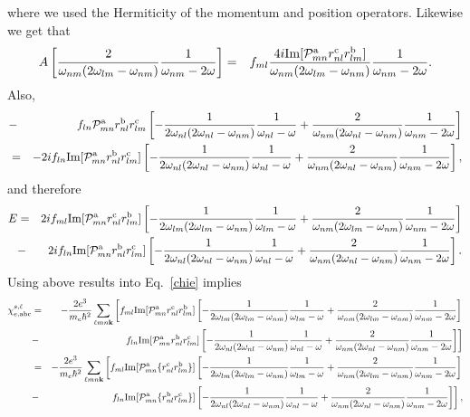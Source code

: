 \documentclass[floatfix,prb,aps,superscriptaddress,11pt,preprint]{revtex4}
\begin{document}
where we used the Hermiticity of the momentum and position operators.
Likewise we get that
\begin{eqnarray}\label{si}
A
\left[
\frac{2}{\omega_{nm}(2\omega_{lm}-\omega_{nm})}\frac{1}{\omega_{nm}-2\omega}
\right]&=&
f_{ml}
\frac{4i\mathrm{Im}[{\cal P}^{\mathrm{a}}_{mn}r^{\mathrm{c}}_{nl}r^{\mathrm{b}}_{lm}]}{\omega_{nm}(2\omega_{lm}-\omega_{nm})}\frac{1}{\omega_{nm}-2\omega}
.
\end{eqnarray}
Also,
\begin{eqnarray}\label{is}
&-&
f_{ln}{\cal P}^{\mathrm{a}}_{mn}r^{\mathrm{b}}_{nl}r^{\mathrm{c}}_{lm}
\left[
-\frac{1}{2\omega_{nl}(2\omega_{nl}-\omega_{nm})}\frac{1}{\omega_{nl}-\omega}
+\frac{2}{\omega_{nm}(2\omega_{nl}-\omega_{nm})}\frac{1}{\omega_{nm}-2\omega}
\right]
\nonumber\\
&=&
-
2if_{ln}\mathrm{Im}[{\cal P}^{\mathrm{a}}_{mn}r^{\mathrm{b}}_{nl}r^{\mathrm{c}}_{lm}]
\left[
-\frac{1}{2\omega_{nl}(2\omega_{nl}-\omega_{nm})}\frac{1}{\omega_{nl}-\omega}
+\frac{2}{\omega_{nm}(2\omega_{nl}-\omega_{nm})}\frac{1}{\omega_{nm}-2\omega}
\right]
,
\end{eqnarray}
and therefore
\begin{eqnarray}\label{pfen}  
E&=&  
2if_{ml}\mathrm{Im}[{\cal P}^{\mathrm{a}}_{mn}r^{\mathrm{c}}_{nl}r^{\mathrm{b}}_{lm}] 
\left[
-\frac{1}{2\omega_{lm}(2\omega_{lm}-\omega_{nm})}\frac{1}{\omega_{lm}-\omega}
+\frac{2}{\omega_{nm}(2\omega_{lm}-\omega_{nm})}\frac{1}{\omega_{nm}-2\omega}
\right]
\nonumber\\
&-& 
2if_{ln}\mathrm{Im}[{\cal P}^{\mathrm{a}}_{mn}r^{\mathrm{b}}_{nl}r^{\mathrm{c}}_{lm}]
\left[
-\frac{1}{2\omega_{nl}(2\omega_{nl}-\omega_{nm})}\frac{1}{\omega_{nl}-\omega}
+\frac{2}{\omega_{nm}(2\omega_{nl}-\omega_{nm})}\frac{1}{\omega_{nm}-2\omega}
\right]
.
\end{eqnarray}  
Using above results into Eq.~\eqref{chie} implies
\begin{eqnarray}\label{pfen3} 
\chi_{e,\mathrm{a}\mathrm{b}\mathrm{c}}^{s,\ell}
&=& 
-\frac{2e^3}{m_e\hbar^2} 
\sum_{\ell m n\mathbf{k}}
\left[ 
f_{ml}\mathrm{Im}[{\cal P}^{\mathrm{a}}_{mn}r^{\mathrm{c}}_{nl}r^{\mathrm{b}}_{lm}] 
\left[
-\frac{1}{2\omega_{lm}(2\omega_{lm}-\omega_{nm})}\frac{1}{\omega_{lm}-\omega}
+\frac{2}{\omega_{nm}(2\omega_{lm}-\omega_{nm})}\frac{1}{\omega_{nm}-2\omega}
\right]
\right.
\nonumber\\
&-&
\left. 
f_{ln}\mathrm{Im}[{\cal P}^{\mathrm{a}}_{mn}r^{\mathrm{b}}_{nl}r^{\mathrm{c}}_{lm}]
\left[
-\frac{1}{2\omega_{nl}(2\omega_{nl}-\omega_{nm})}\frac{1}{\omega_{nl}-\omega}
+\frac{2}{\omega_{nm}(2\omega_{nl}-\omega_{nm})}\frac{1}{\omega_{nm}-2\omega}
\right]
\right]
\nonumber\\
&=& 
-\frac{2e^3}{m_e\hbar^2} 
\sum_{\ell m n\mathbf{k}}
\left[ 
f_{ml}\mathrm{Im}[{\cal P}^{\mathrm{a}}_{mn}\{r^{\mathrm{c}}_{nl}r^{\mathrm{b}}_{lm}\}] 
\left[
-\frac{1}{2\omega_{lm}(2\omega_{lm}-\omega_{nm})}\frac{1}{\omega_{lm}-\omega}
+\frac{2}{\omega_{nm}(2\omega_{lm}-\omega_{nm})}\frac{1}{\omega_{nm}-2\omega}
\right]
\right.
\nonumber\\
&-&
\left. 
f_{ln}\mathrm{Im}[{\cal P}^{\mathrm{a}}_{mn}\{r^{\mathrm{b}}_{nl}r^{\mathrm{c}}_{lm}\}]
\left[
-\frac{1}{2\omega_{nl}(2\omega_{nl}-\omega_{nm})}\frac{1}{\omega_{nl}-\omega}
+\frac{2}{\omega_{nm}(2\omega_{nl}-\omega_{nm})}\frac{1}{\omega_{nm}-2\omega}
\right]
\right]
,
\end{eqnarray}  
\end{document}
